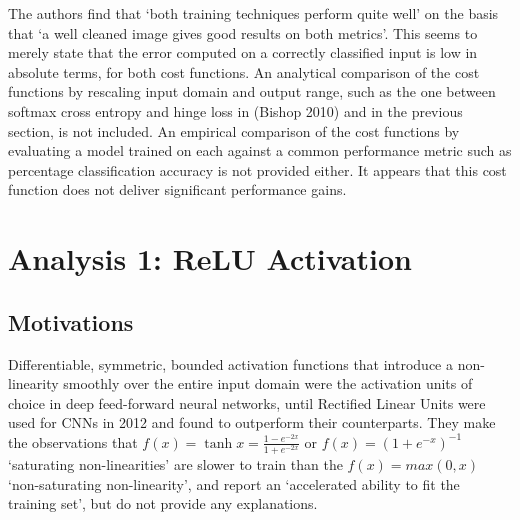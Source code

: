 \documentclass[a4paper,11pt]{article}
\begin{document}
The authors find that `both training techniques perform quite well' on the basis that `a well cleaned image gives good results on both metrics'. This seems to merely state that the error computed on a correctly classified input is low in absolute terms, for both cost functions. An analytical comparison of the cost functions by rescaling input domain and output range, such as the one between softmax cross entropy and hinge loss in (Bishop 2010) \cite{ML-book} and in the previous section, is not included. An empirical comparison of the cost functions by evaluating a model trained on each against a common performance metric such as percentage classification accuracy is not provided either. It appears that this cost function does not deliver significant performance gains.

\clearpage

\section{Analysis 1: ReLU Activation}

\subsection{Motivations}

Differentiable, symmetric, bounded activation functions that introduce a non-linearity smoothly over the entire input domain were the activation units of choice in deep feed-forward neural networks, until Rectified Linear Units were used for CNNs in 2012 \cite{krizhevsky} and found to outperform their counterparts. They make the observations that $f(x) = \tanh x = \frac{1 - e^{-2x}}{1 + e^{-2x}}$ or $f(x) = (1+ e^{-x})^{-1}$ `saturating non-linearities' are slower to train than the $f(x) = max(0,x)$ `non-saturating non-linearity', and report an `accelerated ability to fit the training set', but do not provide any explanations.   \\
\end{document}
